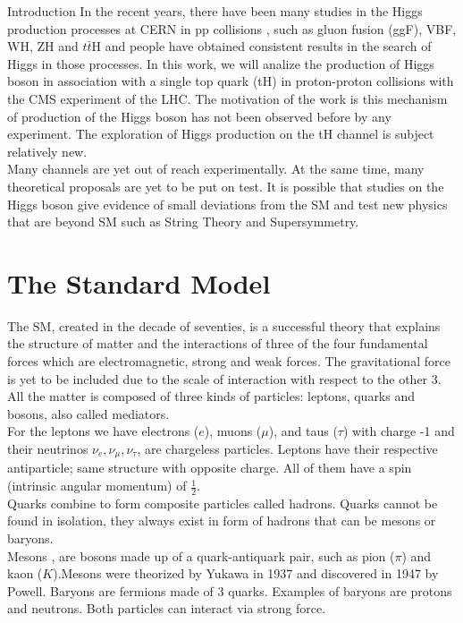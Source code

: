 \begin{chapter}{Introduction}
In the recent years, there have been many studies in the Higgs production processes at CERN in pp collisions , such as gluon fusion (ggF), VBF, WH, ZH and $t\bar{t}$H and people have obtained consistent results in the search of Higgs in those processes. 
In this work, we will analize the production of Higgs boson in association with a
single top quark (tH) in proton-proton collisions with the CMS experiment of the LHC. 
The motivation of the work is this mechanism of production of the Higgs boson has not been observed before by any experiment. The exploration of Higgs production on the tH channel is subject relatively new. %
\\
Many channels are yet out of
reach experimentally. At the same time, many theoretical
proposals are yet to be put on test. It is possible that studies on the Higgs boson give evidence of small deviations from the SM  and test new physics that are beyond SM such as String Theory and  Supersymmetry. \\


\section{The Standard Model}  %
The SM, created in the decade of seventies, is a successful theory that explains the structure of matter and the interactions of three of the four fundamental forces which are electromagnetic, strong and weak forces. The gravitational force is yet to be included due to the scale of interaction with respect to the other 3.  All the matter is composed of three kinds of particles: leptons, quarks and bosons, also called mediators.\\

For the leptons we have electrons ($e$), muons ($\mu$), and taus ($\tau$) with charge -1 and their neutrinos $\nu_e, \nu_\mu,\nu_\tau$, are chargeless particles. Leptons have their respective antiparticle; same structure with opposite charge. 
 All of them have a spin (intrinsic angular momentum) of $\frac{1}{2}$\cite{griff}.%
\\

 Quarks combine to form composite particles called hadrons. Quarks cannot be found in isolation, they always exist in form of hadrons that can be mesons or baryons. \\
Mesons , are bosons made up of a quark-antiquark pair, such as pion ($\pi$) and kaon ($K$).Mesons were theorized by Yukawa in 1937 and discovered in 1947 by Powell\cite{griff}.
Baryons are fermions made of 3 quarks. Examples of baryons are protons and neutrons. Both particles can interact via strong force.
\\


\end{chapter}
